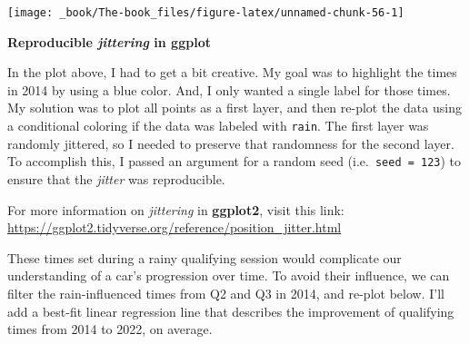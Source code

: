\documentclass[
]{book}
\begin{document}
\begin{center}\texttt{[image: \_book/The-book\_files/figure-latex/unnamed-chunk-56-1]} \end{center}

\begin{blackbox}

\begin{center}
\textbf{Reproducible \emph{jittering} in ggplot}

\end{center}

In the plot above, I had to get a bit creative. My goal was to highlight the times in 2014 by using a blue color. And, I only wanted a single label for those times. My solution was to plot all points as a first layer, and then re-plot the data using a conditional coloring if the data was labeled with \texttt{rain}. The first layer was randomly jittered, so I needed to preserve that randomness for the second layer. To accomplish this, I passed an argument for a random seed (i.e.~\texttt{seed\ =\ 123}) to ensure that the \emph{jitter} was reproducible.

For more information on \emph{jittering} in \textbf{ggplot2}, visit this link: \url{https://ggplot2.tidyverse.org/reference/position_jitter.html}

\end{blackbox}

These times set during a rainy qualifying session would complicate our understanding of a car's progression over time. To avoid their influence, we can filter the rain-influenced times from Q2 and Q3 in 2014, and re-plot below. I'll add a best-fit linear regression line that describes the improvement of qualifying times from 2014 to 2022, on average.
\end{document}
